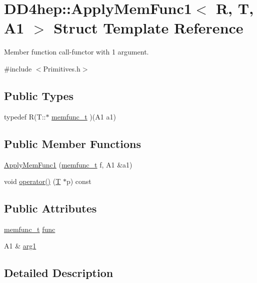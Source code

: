 \hypertarget{struct_d_d4hep_1_1_apply_mem_func1}{
\section{DD4hep::ApplyMemFunc1$<$ R, T, A1 $>$ Struct Template Reference}
\label{struct_d_d4hep_1_1_apply_mem_func1}
}


Member function call-\/functor with 1 argument.  


{\ttfamily \#include $<$Primitives.h$>$}\subsection*{Public Types}
\begin{DoxyCompactItemize}
\item 
typedef R(T::$\ast$ \hyperlink{struct_d_d4hep_1_1_apply_mem_func1_a441bb84a015a0f88ef07f25f74f761d1}{memfunc\_\-t} )(A1 a1)
\end{DoxyCompactItemize}
\subsection*{Public Member Functions}
\begin{DoxyCompactItemize}
\item 
\hyperlink{struct_d_d4hep_1_1_apply_mem_func1_aa912c5b5b164fd74df16143aa1b85140}{ApplyMemFunc1} (\hyperlink{struct_d_d4hep_1_1_apply_mem_func1_a441bb84a015a0f88ef07f25f74f761d1}{memfunc\_\-t} f, A1 \&a1)
\item 
void \hyperlink{struct_d_d4hep_1_1_apply_mem_func1_ab3d4262b3d53ce31d0930561e3e15bb0}{operator()} (\hyperlink{class_t}{T} $\ast$p) const 
\end{DoxyCompactItemize}
\subsection*{Public Attributes}
\begin{DoxyCompactItemize}
\item 
\hyperlink{struct_d_d4hep_1_1_apply_mem_func1_a441bb84a015a0f88ef07f25f74f761d1}{memfunc\_\-t} \hyperlink{struct_d_d4hep_1_1_apply_mem_func1_ac13bb60da947716106d65b273854ef73}{func}
\item 
A1 \& \hyperlink{struct_d_d4hep_1_1_apply_mem_func1_aa1ef32d2750d2c3a55881e9198ba78d2}{arg1}
\end{DoxyCompactItemize}


\subsection{Detailed Description}
